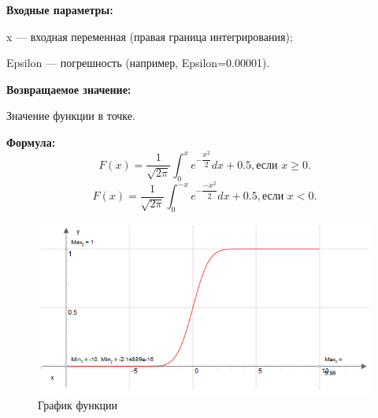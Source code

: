 \textbf{Входные параметры:}

 x --- входная переменная (правая граница интегрирования);
 
 Epsilon --- погрешность (например, Epsilon=0.00001).

\textbf{Возвращаемое значение:}

 Значение функции в точке.
 
\textbf{Формула:}
\begin{equation*}
F\left(x \right)=\dfrac{1}{\sqrt{2\pi}}\int_0^x {e^{-\dfrac{x^2}{2}}dx}+0.5, \text{если } x \geq 0.
\end{equation*}
\begin{equation*}
F\left(x \right)=\dfrac{1}{\sqrt{2\pi}}\int_0^{-x} {e^{-\dfrac{-x^2}{2}}dx}+0.5, \text{если } x < 0.
\end{equation*}

 \begin{figure} [h] 
   \center
   \includegraphics {MHL_DistributionFunctionOfNormalizedCenteredNormalDistribution_Graph.png}
   \caption{График функции} 
   \label{img:MHL_DistributionFunctionOfNormalizedCenteredNormalDistribution_Graph}  
 \end{figure}
 
